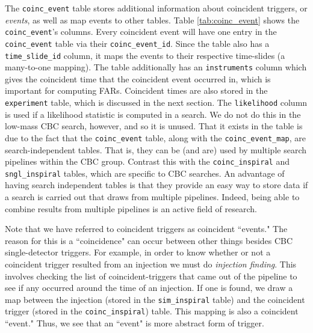 The \texttt{coinc\_event} table stores additional information about coincident
triggers, or \emph{events}, as well as map events to other tables. Table
\ref{tab:coinc_event} shows the \texttt{coinc\_event}'s columns. Every
coincident event will have one entry in the \texttt{coinc\_event} table via
their \texttt{coinc\_event\_id}. Since the table also has a
\texttt{time\_slide\_id} column, it maps the events to their respective
time-slides (a many-to-one mapping). The table additionally has an
\texttt{instruments} column which gives the coincident time that the coincident
event occurred in, which is important for computing \acp{FAR}. Coincident times
are also stored in the \texttt{experiment} table, which is discussed in the
next section. The \texttt{likelihood} column is used if a likelihood statistic
is computed in a search. We do not do this in the low-mass \ac{CBC} search,
however, and so it is unused. That it exists in the table is due to the fact
that the \texttt{coinc\_event} table, along with the
\texttt{coinc\_event\_map}, are search-independent tables. That is, they can be
(and are) used by multiple search pipelines within the \ac{CBC} group. Contrast
this with the \texttt{coinc\_inspiral} and \texttt{sngl\_inspiral} tables,
which are specific to \ac{CBC} searches. An advantage of having search
independent tables is that they provide an easy way to store data if a search
is carried out that draws from multiple pipelines. Indeed, being able to
combine results from multiple pipelines is an active field of research.

Note that we have referred to coincident triggers as coincident ``events." The
reason for this is a ``coincidence" can occur between other things besides
\ac{CBC} single-detector triggers. For example, in order to know whether or not
a coincident trigger resulted from an injection we must do \emph{injection
finding}. This involves checking the list of coincident-triggers that came out
of the pipeline to see if any occurred around the time of an injection. If one
is found, we draw a map between the injection (stored in the
\texttt{sim\_inspiral} table) and the coincident trigger (stored in the
\texttt{coinc\_inspiral}) table. This mapping is also a coincident ``event."
Thus, we see that an ``event" is more abstract form of trigger.


